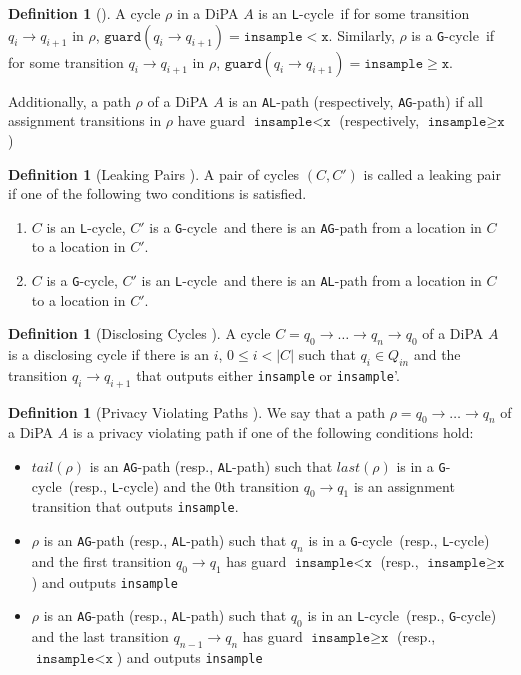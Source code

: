 \documentclass[12pt]{article}
\newcommand{\gguard}[1][x]{\texttt{insample}\geq#1}
\newcommand{\lguard}[1][x]{\texttt{insample} < #1}
\newcommand{\guard}{\texttt{guard}}
\newcommand{\gcycle}{\texttt{G}-cycle}
\newcommand{\lcycle}{\texttt{L}-cycle}
\theoremstyle{definition}
\newtheorem{defn}[thm]{Definition}
\begin{document}
\begin{defn}[\cite{chadhaLinearTimeDecidability2021}]
    A cycle $\rho$ in a DiPA $A$ is an \lcycle~if for some transition $q_i\to q_{i+1}$ in $\rho$, $\guard(q_i\to q_{i+1}) = \lguard[\texttt{x}]$. Similarly, $\rho$ is a \gcycle~if for some transition $q_i\to q_{i+1}$ in $\rho$, $\guard(q_i\to q_{i+1}) = \gguard[\texttt{x}]$.
    
    Additionally, a path $\rho$ of a DiPA $A$ is an \texttt{AL}-path (respectively, \texttt{AG}-path) if all assignment transitions in $\rho$ have guard $\lguard[\texttt{x}]$ (respectively, $\gguard[\texttt{x}]$)
\end{defn}

\begin{defn}[Leaking Pairs \cite{chadhaLinearTimeDecidability2021}]
    A pair of cycles $(C, C')$ is called a leaking pair if one of the following two conditions is satisfied.
    \begin{enumerate}
        \item $C$ is an \lcycle, $C'$ is a \gcycle~and there is an \texttt{AG}-path from a location in $C$ to a location in $C'$.
        \item $C$ is a \gcycle, $C'$ is an \lcycle~and there is an \texttt{AL}-path from a location in $C$ to a location in $C'$.
    \end{enumerate}
\end{defn}

\begin{defn}[Disclosing Cycles \cite{chadhaLinearTimeDecidability2021}]
    A cycle $C = q_0\to \ldots \to q_n \to q_0$ of a DiPA $A$ is a disclosing cycle if there is an $i$, $0 \leq i < |C|$ such that $q_i\in Q_{in}$ and the transition $q_i\to q_{i+1}$ that outputs either \texttt{insample} or \texttt{insample}'.
\end{defn}

\begin{defn}[Privacy Violating Paths \cite{chadhaLinearTimeDecidability2021}]
    We say that a path $\rho = q_0\to\ldots \to q_n $ of a DiPA $A$ is a privacy violating path if one of the following conditions hold:
    \begin{itemize}
        \item  $tail(\rho)$ is an \texttt{AG}-path (resp., \texttt{AL}-path) such that $last(\rho)$ is in a \gcycle~(resp., \lcycle) and the 0th transition $q_0\to q_1$ is an assignment transition that outputs \texttt{insample}.
        \item $\rho$ is an \texttt{AG}-path (resp., \texttt{AL}-path) such that $q_n$ is in a \gcycle~(resp., \lcycle) and the first transition $q_0\to q_1$ has guard $\lguard[\texttt{x}]$ (resp., $\gguard[\texttt{x}]$) and outputs \texttt{insample}
        \item $\rho$ is an \texttt{AG}-path (resp., \texttt{AL}-path) such that $q_0$ is in an \lcycle~(resp., \gcycle) and the last transition $q_{n-1}\to q_n$ has guard $\gguard[\texttt{x}]$ (resp., $\lguard[\texttt{x}]$) and outputs \texttt{insample}
    \end{itemize}
\end{defn}
\end{document}

